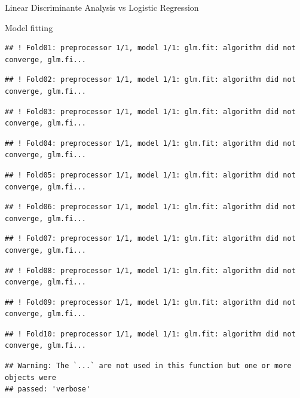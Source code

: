 \documentclass[
  ignorenonframetext,
]{article}
\begin{document}
\begin{frame}[fragile]{Linear Discriminante Analysis vs Logistic Regression}
\begin{block}{Model fitting}
\begin{verbatim}
## ! Fold01: preprocessor 1/1, model 1/1: glm.fit: algorithm did not converge, glm.fi...
\end{verbatim}

\begin{verbatim}
## ! Fold02: preprocessor 1/1, model 1/1: glm.fit: algorithm did not converge, glm.fi...
\end{verbatim}

\begin{verbatim}
## ! Fold03: preprocessor 1/1, model 1/1: glm.fit: algorithm did not converge, glm.fi...
\end{verbatim}

\begin{verbatim}
## ! Fold04: preprocessor 1/1, model 1/1: glm.fit: algorithm did not converge, glm.fi...
\end{verbatim}

\begin{verbatim}
## ! Fold05: preprocessor 1/1, model 1/1: glm.fit: algorithm did not converge, glm.fi...
\end{verbatim}

\begin{verbatim}
## ! Fold06: preprocessor 1/1, model 1/1: glm.fit: algorithm did not converge, glm.fi...
\end{verbatim}

\begin{verbatim}
## ! Fold07: preprocessor 1/1, model 1/1: glm.fit: algorithm did not converge, glm.fi...
\end{verbatim}

\begin{verbatim}
## ! Fold08: preprocessor 1/1, model 1/1: glm.fit: algorithm did not converge, glm.fi...
\end{verbatim}

\begin{verbatim}
## ! Fold09: preprocessor 1/1, model 1/1: glm.fit: algorithm did not converge, glm.fi...
\end{verbatim}

\begin{verbatim}
## ! Fold10: preprocessor 1/1, model 1/1: glm.fit: algorithm did not converge, glm.fi...
\end{verbatim}

\begin{verbatim}
## Warning: The `...` are not used in this function but one or more objects were
## passed: 'verbose'
\end{verbatim}


\end{block}
\end{frame}
\end{document}
